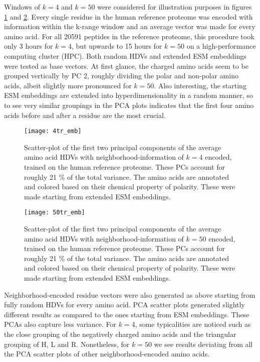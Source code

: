 Windows of $k = 4$ and $k = 50$ were considered for illustration purposes in figures \ref{fig:AAtr4} and \ref{fig:AAtr50}. Every single residue in the human reference proteome was encoded with information within the k-range window and an average vector was made for every amino acid. For all 20591 peptides in the reference proteome, this procedure took only 3 hours for $k = 4$, but upwards to 15 hours for $k = 50$ on a high-performance computing cluster (HPC). Both random HDVs and extended ESM embeddings were tested as base vectors. At first glance, the charged amino acids seem to be grouped vertically by PC 2, roughly dividing the polar and non-polar amino acids, albeit slightly more pronounced for $k = 50$. Also interesting, the starting ESM embeddings are extended into hyperdimensionality in a random manner, so to see very similar groupings in the PCA plots indicates that the first four amino acids before and after a residue are the most crucial.

\begin{figure}[H]
    \centering
    \texttt{[image: 4tr\_emb]}
    \caption{Scatter-plot of the first two principal components of the average amino acid HDVs with neighborhood-information of $k = 4$ encoded, trained on the human reference proteome. These PCs account for roughly 21 \% of the total variance. The amino acids are annotated and colored based on their chemical property of polarity. These were made starting from extended ESM embeddings.}
    \label{fig:AAtr4}
\end{figure}

\begin{figure}[H]
    \centering
    \texttt{[image: 50tr\_emb]}
    \caption{Scatter-plot of the first two principal components of the average amino acid HDVs with neighborhood-information of $k = 50$ encoded, trained on the human reference proteome. These PCs account for roughly 21 \% of the total variance. The amino acids are annotated and colored based on their chemical property of polarity. These were made starting from extended ESM embeddings.}
    \label{fig:AAtr50}
\end{figure}

Neighborhood-encoded residue vectors were also generated as above starting from fully random HDVs for every amino acid. PCA scatter plots generated slightly different results as compared to the ones starting from ESM embeddings. These PCAs also capture less variance. For $k = 4$, some typicalities are noticed such as the close grouping of the negatively charged amino acids and the triangular grouping of H, L and R. Nonetheless, for $k = 50$ we see results deviating from all the PCA scatter plots of other neighborhood-encoded amino acids. 

